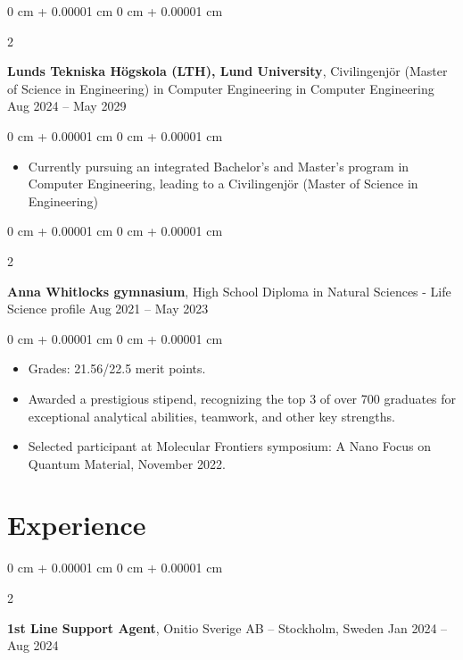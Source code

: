 \documentclass[10pt, letterpaper]{article}
\newenvironment{highlights}{
    \begin{itemize}[
        topsep=0.10 cm,
        parsep=0.10 cm,
        partopsep=0pt,
        itemsep=0pt,
        leftmargin=0 cm + 10pt
    ]
}{
    \end{itemize}
} %
\newenvironment{onecolentry}{
    \begin{adjustwidth}{
        0 cm + 0.00001 cm
    }{
        0 cm + 0.00001 cm
    }
}{
    \end{adjustwidth}
} %
\newenvironment{twocolentry}[2][]{
    \onecolentry
    \def\secondColumn{#2}
    \setcolumnwidth{\fill, 4.5 cm}
    \begin{paracol}{2}
}{
    \switchcolumn \raggedleft \secondColumn
    \end{paracol}
    \endonecolentry
} %
\begin{document}
        
        \begin{twocolentry}{
            Aug 2024 – May 2029
        }
            \textbf{Lunds Tekniska Högskola (LTH), Lund University}, Civilingenjör (Master of Science in Engineering) in Computer Engineering in Computer Engineering\end{twocolentry}

        \vspace{0.10 cm}
        \begin{onecolentry}
            \begin{highlights}
                \item Currently pursuing an integrated Bachelor's and Master's program in Computer Engineering, leading to a Civilingenjör (Master of Science in Engineering)
            \end{highlights}
        \end{onecolentry}


        \vspace{0.2 cm}

        \begin{twocolentry}{
            Aug 2021 – May 2023
        }
            \textbf{Anna Whitlocks gymnasium}, High School Diploma in Natural Sciences - Life Science profile\end{twocolentry}

        \vspace{0.10 cm}
        \begin{onecolentry}
            \begin{highlights}
                \item Grades: 21.56/22.5 merit points.
                \item Awarded a prestigious stipend, recognizing the top 3 of over 700 graduates for exceptional analytical abilities, teamwork, and other key strengths.
                \item Selected participant at Molecular Frontiers symposium: A Nano Focus on Quantum Material, November 2022.
            \end{highlights}
        \end{onecolentry}



    
    \section{Experience}



        
        \begin{twocolentry}{
            Jan 2024 – Aug 2024
        }
            \textbf{1st Line Support Agent}, Onitio Sverige AB -- Stockholm, Sweden\end{twocolentry}
\end{document}
